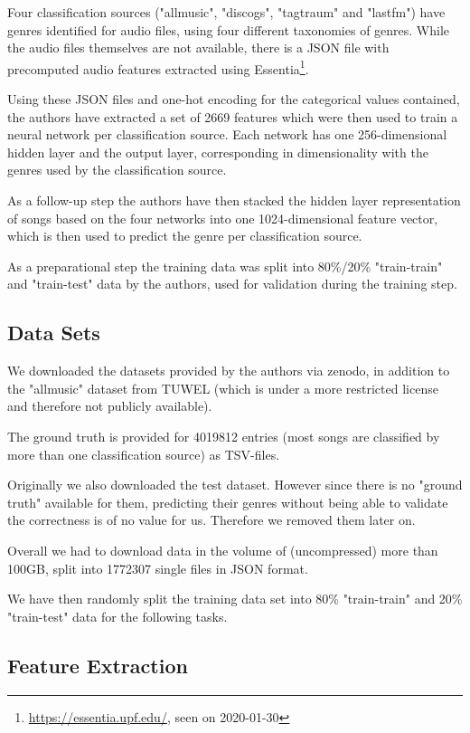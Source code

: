 \documentclass[sigconf,nonacm]{acmart}
\begin{document}
Four classification sources ("allmusic", "discogs", "tagtraum" and "lastfm")
have genres identified for audio files, using four different taxonomies
of genres.
While the audio files themselves are not available, there is a JSON
file with precomputed audio features extracted using 
Essentia\footnote{\url{https://essentia.upf.edu/}, seen on 2020-01-30}.

Using these JSON files and one-hot encoding for the categorical
values contained,
the authors have extracted a set of 2669 features which were
then used to train a neural network per classification source.
Each network has one 256-dimensional hidden layer and the output layer,
corresponding in dimensionality with the genres used by the classification
source. 

As a follow-up step the authors have then stacked the hidden
layer representation of songs based on the four networks into
one 1024-dimensional feature vector, which is then used to predict
the genre per classification source.

As a preparational step the training data was split into 80\%/20\%
"train-train" and "train-test" data by the authors,
used for validation during the training step.

\subsection{Data Sets}

We downloaded the datasets provided by the authors via zenodo,
in addition to the "allmusic" dataset from TUWEL
(which is under a more restricted license and therefore not
publicly available).

The ground truth is provided for 4019812 entries (most songs are
classified by more than one classification source) as TSV-files.

Originally we also downloaded the test dataset.
However since there is no "ground truth" available for them, predicting
their genres without being able to validate the correctness is of
no value for us.
Therefore we removed them later on.

Overall we had to download data in the volume of (uncompressed)
more than 100GB,
split into 1772307 single files in JSON format.

We have then randomly split the training data set into 80\%
"train-train" and 20\% "train-test" data for the following tasks.

\subsection{Feature Extraction}
\end{document}
